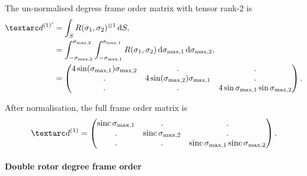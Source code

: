 The un-normalised  degress frame order matrix with tensor rank-2 is
\begin{subequations}
\begin{align}
    \FOonep &= \int_S R(\sigma_1, \sigma_2)^{\otimes 1} \diff S, \\
            &= \int_{-\conesmaxtwo}^{\conesmaxtwo} \int_{-\conesmaxone}^{\conesmaxone} R(\sigma_1, \sigma_2) \diff \conesmaxone \diff \conesmaxtwo, \\
            &=
               \begin{pmatrix}
                   4\sin(\conesmaxone)\conesmaxtwo & .                               & . \\
                   .                               & 4\sin(\conesmaxtwo)\conesmaxone & . \\
                   .                               & .                               & 4\sin\conesmaxone\sin\conesmaxtwo
               \end{pmatrix}.
\end{align}
\end{subequations}

After normalisation, the full frame order matrix is
\begin{equation} \label{eq: double rotor 1st degree frame order matrix}
    \FOone =
        \begin{pmatrix}
            \sinc\conesmaxone & .                 & . \\
            .                 & \sinc\conesmaxtwo & . \\
            .                 & .                 & \sinc\conesmaxone\sinc\conesmaxtwo
        \end{pmatrix}.
\end{equation}

\paragraph{Double rotor  degree frame order}

